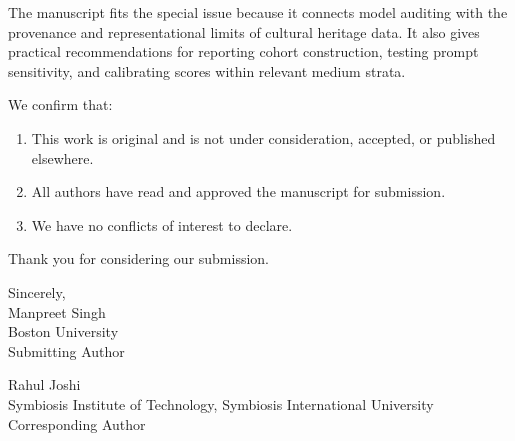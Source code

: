 \documentclass[11pt]{article}
\begin{document}
The manuscript fits the special issue because it connects model auditing with the provenance and representational limits of cultural heritage data. It also gives practical recommendations for reporting cohort construction, testing prompt sensitivity, and calibrating scores within relevant medium strata.

We confirm that:

\begin{enumerate}
    \item This work is original and is not under consideration, accepted, or published elsewhere.
    \item All authors have read and approved the manuscript for submission.
    \item We have no conflicts of interest to declare.
\end{enumerate}

Thank you for considering our submission.

\vspace{1em}

\noindent Sincerely,\\[0.5em]
\noindent Manpreet Singh\\
\noindent Boston University\\
\noindent Submitting Author

\vspace{0.75em}

\noindent Rahul Joshi\\
\noindent Symbiosis Institute of Technology, Symbiosis International University\\
\noindent Corresponding Author
\end{document}
